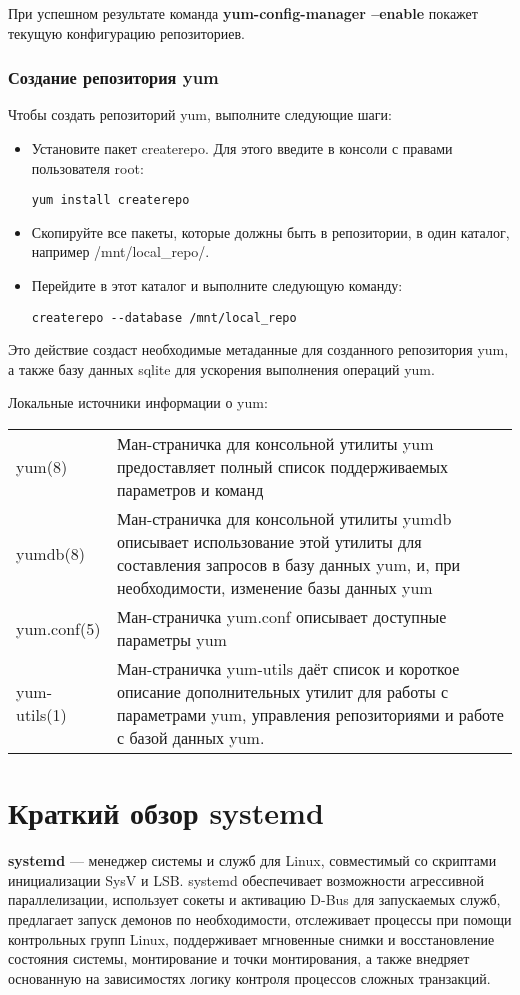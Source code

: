 \documentclass[a4paper,10pt,twoside]{article}
\begin{document}
При успешном результате команда \textbf{yum-config-manager --enable} покажет текущую конфигурацию репозиториев. 


\subsubsection{Создание репозитория yum}
Чтобы создать репозиторий yum, выполните следующие шаги:
\begin{itemize}
 \item Установите пакет createrepo. Для этого введите в консоли с правами пользователя root: 
\begin{verbatim}
yum install createrepo
\end{verbatim} 
\item Скопируйте все пакеты, которые должны быть в репозитории, в один каталог, например /mnt/local\_repo/.
\item Перейдите в этот каталог и выполните следующую команду:
\begin{verbatim}
createrepo --database /mnt/local_repo
\end{verbatim} 
\end{itemize}


Это действие создаст необходимые метаданные для созданного репозитория yum, а также базу данных sqlite для ускорения выполнения операций yum.

Локальные источники информации о yum:

\begin{longtable}{  m{4cm}  m{15cm}  }  
yum(8) & Ман-страничка для консольной утилиты yum предоставляет полный список поддерживаемых параметров и команд\\
yumdb(8) & Ман-страничка для консольной утилиты yumdb описывает использование этой утилиты для составления запросов в базу данных yum, и, при необходимости, изменение базы данных yum\\
yum.conf(5) & Ман-страничка yum.conf описывает доступные параметры yum\\
yum-utils(1) & Ман-страничка yum-utils даёт список и короткое описание дополнительных утилит для работы с параметрами yum, управления репозиториями и работе с базой данных yum.\\
\end{longtable}

\section{Краткий обзор ⁠systemd}
\textbf{systemd} — менеджер системы и служб для Linux, совместимый со скриптами инициализации SysV и LSB. systemd обеспечивает возможности агрессивной параллелизации, использует сокеты и активацию D-Bus для запускаемых служб, предлагает запуск демонов по необходимости, отслеживает процессы при помощи контрольных групп Linux, поддерживает мгновенные снимки и восстановление состояния системы, монтирование и точки монтирования, а также внедряет основанную на зависимостях логику контроля процессов сложных транзакций.
\end{document}
